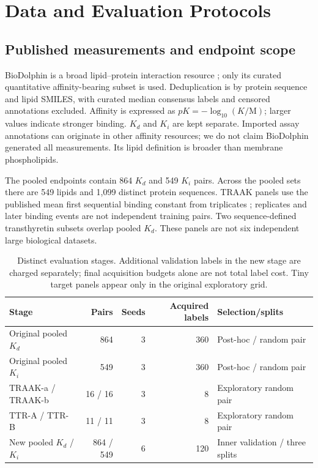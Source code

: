\documentclass[wcp]{jmlr}
\begin{document}
\section{Data and Evaluation Protocols}
\subsection{Published measurements and endpoint scope}
BioDolphin is a broad lipid--protein interaction resource
\citep{yang2024}; only its curated quantitative affinity-bearing subset is
used. Deduplication is by protein sequence and lipid SMILES, with curated
median consensus labels and censored annotations excluded. Affinity is
expressed as $pK=-\log_{10}(K/\mathrm M)$; larger values indicate stronger
binding. $K_d$ and $K_i$ are kept separate. Imported assay annotations can
originate in other affinity resources; we do not claim BioDolphin generated
all measurements. Its lipid definition is broader than membrane phospholipids.

The pooled endpoints contain 864 $K_d$ and 549 $K_i$ pairs. Across the pooled
sets there are 549 lipids and 1,099 distinct protein sequences. TRAAK panels
use the published mean first sequential binding constant from triplicates
\citep{schrecke2021}; replicates and later binding events are not independent
training pairs. Two sequence-defined transthyretin subsets overlap pooled
$K_d$. These panels are not six independent large biological datasets.

\begin{table}[t]
\centering\small
\caption{Distinct evaluation stages. Additional validation labels in the new
stage are charged separately; final acquisition budgets alone are not total
label cost. Tiny target panels appear only in the original exploratory grid.}
\label{tab:stages}
\begin{tabular}{lrrrl}
\toprule
Stage & Pairs & Seeds & Acquired labels & Selection/splits\\
\midrule
Original pooled $K_d$ &864&3&360&Post-hoc / random pair\\
Original pooled $K_i$ &549&3&360&Post-hoc / random pair\\
TRAAK-a / TRAAK-b &16 / 16&3&8&Exploratory random pair\\
TTR-A / TTR-B &11 / 11&3&8&Exploratory random pair\\
New pooled $K_d$ / $K_i$ &864 / 549&6&120&Inner validation / three splits\\
\bottomrule
\end{tabular}
\end{table}
\end{document}
